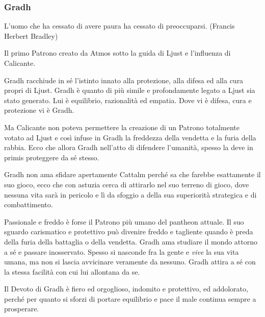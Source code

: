 \begin{multicols}{2}
\subsubsection{Gradh}\label{gradh}\hypertarget{gradh}{}

\begin{enfasi}
L'uomo che ha cessato di avere paura ha cessato di preoccuparsi. (Francis Herbert Bradley)
\end{enfasi}

Il primo Patrono creato da Atmos sotto la guida di Ljust e l'influenza di Calicante.

Gradh racchiude in sé l'istinto innato alla protezione, alla difesa ed alla cura propri di Ljust. Gradh è quanto di più simile e profondamente legato a Ljust sia stato generato. Lui è equilibrio, razionalità ed empatia.
Dove vi è difesa, cura e protezione vi è Gradh.

Ma Calicante non poteva permettere la creazione di un Patrono totalmente votato ad Ljust e così infuse in Gradh la freddezza della vendetta e la furia della rabbia. Ecco che allora Gradh nell'atto di difendere l'umanità, spesso la deve in primis proteggere da sé stesso.

Gradh non ama sfidare apertamente Cattalm perché sa che farebbe esattamente il suo gioco, ecco che con astuzia cerca di attirarlo nel suo terreno di gioco, dove nessuna vita sarà in pericolo e lì da sfoggio a della sua superiorità strategica e di combattimento.

Passionale e freddo è forse il Patrono più umano del pantheon attuale. Il suo sguardo carismatico e protettivo può divenire freddo e tagliente quando è preda della furia della battaglia o della vendetta. Gradh ama studiare il mondo attorno a sé e passare inosservato. Spesso si nasconde fra la gente e \emph{vive} la sua vita umana, ma non si lascia avvicinare veramente da nessuno. Gradh attira a sé con la stessa facilità con cui lui allontana da se.

Il Devoto di Gradh è fiero ed orgoglioso, indomito e protettivo, ed addolorato, perché per quanto si sforzi di portare equilibrio e pace il male continua sempre a prosperare.


\end{multicols}
